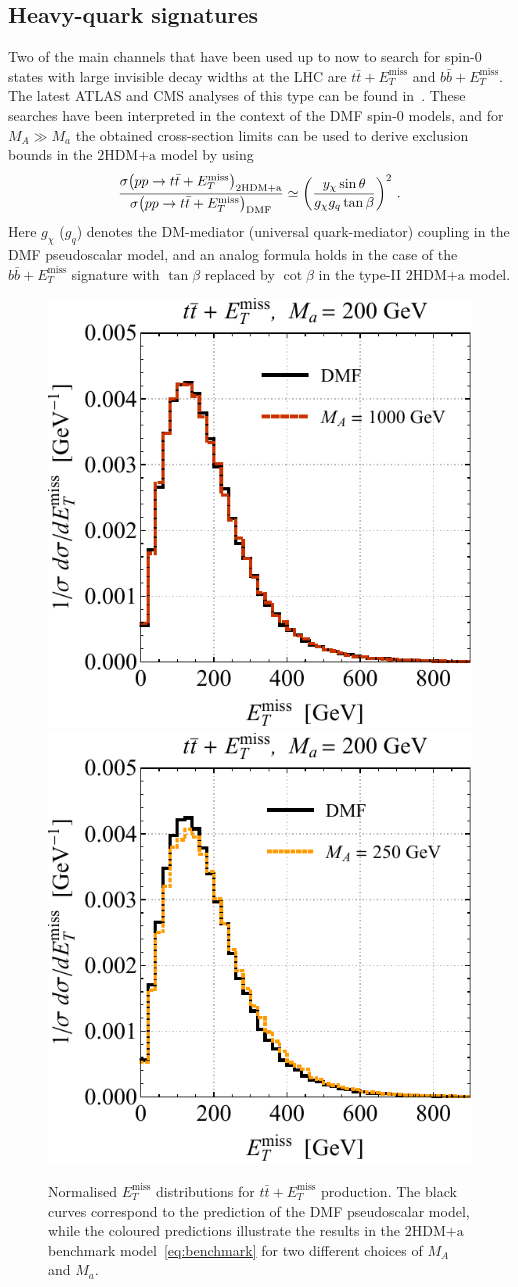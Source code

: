 \documentclass[a4paper, 11pt,notoc]{article}
\newcommand{\MET}{\ensuremath{E_T^\mathrm{miss}}\xspace}
\newcommand{\mA}{\ensuremath{M_{A}}\xspace}
\newcommand{\ma}{\ensuremath{M_{a}}\xspace}
\newcommand{\hdma}{\ensuremath{\textrm{2HDM+a}}\xspace}
\begin{document}
\subsection*{Heavy-quark signatures}

Two of the main channels that have been used up to now  to search for spin-0 states with large invisible decay widths at the LHC are $t \bar t + \MET$ and $b \bar b + \MET$. The latest ATLAS and CMS analyses of this type can be found in~\cite{Aaboud:2017rzf,Sirunyan:2018dub}. These searches have been interpreted in the context of the DMF spin-0   models, and for $M_A \gg M_a$ the obtained cross-section limits can be used  to derive exclusion bounds in the \hdma model by using~\cite{Bauer:2017ota}
\begin{equation} \label{eq:rescaling}
\frac{\sigma \! \left ( pp \to t \bar t + \MET\right )_{\hdma}}{\sigma \! \left ( pp \to t \bar t + \MET\right )_{\rm DMF}} \simeq \left ( \frac{y_\chi \sin \theta}{g_\chi g_q \tan \beta} \right )^2 \, .
\end{equation}
Here $g_\chi$ ($g_q$) denotes the DM-mediator (universal quark-mediator) coupling in the DMF  pseudoscalar  model, and an analog formula holds in the case of the $b \bar b + \MET$ signature with $\tan \beta$ replaced by $\cot \beta$ in the type-II \hdma model. 

\begin{figure}[t!]
\centering
\includegraphics[height=0.45\textwidth]{ttmetl.pdf} \qquad 
\includegraphics[height=0.45\textwidth]{ttmetr.pdf}
\vspace{2mm}
\caption{\label{fig:ttmet} Normalised $\MET$ distributions for $t \bar t + \MET$ production. The black curves correspond to the prediction of the DMF pseudoscalar   model, while the coloured predictions illustrate the results in the \hdma benchmark model~\eqref{eq:benchmark} for two different choices of $\mA$ and $\ma$.} 
\end{figure}
\end{document}
